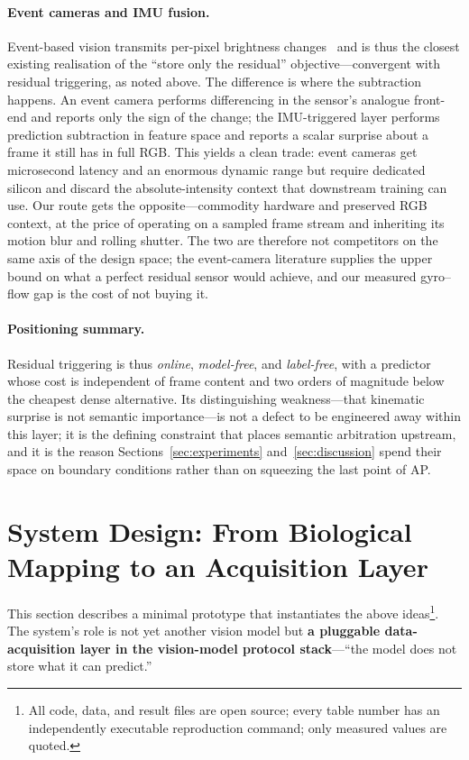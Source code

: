 \documentclass[12pt,a4paper]{article}
\begin{document}
\paragraph{Event cameras and IMU fusion.}
Event-based vision transmits per-pixel brightness changes~\cite{gallego2020} and is thus the closest existing realisation of the ``store only the residual'' objective---convergent with residual triggering, as noted above. The difference is where the subtraction happens. An event camera performs differencing in the sensor's analogue front-end and reports only the sign of the change; the IMU-triggered layer performs prediction subtraction in feature space and reports a scalar surprise about a frame it still has in full RGB. This yields a clean trade: event cameras get microsecond latency and an enormous dynamic range but require dedicated silicon and discard the absolute-intensity context that downstream training can use. Our route gets the opposite---commodity hardware and preserved RGB context, at the price of operating on a sampled frame stream and inheriting its motion blur and rolling shutter. The two are therefore not competitors on the same axis of the design space; the event-camera literature supplies the upper bound on what a perfect residual sensor would achieve, and our measured gyro--flow gap is the cost of not buying it.

\paragraph{Positioning summary.} Residual triggering is thus \emph{online}, \emph{model-free}, and \emph{label-free}, with a predictor whose cost is independent of frame content and two orders of magnitude below the cheapest dense alternative. Its distinguishing weakness---that kinematic surprise is not semantic importance---is not a defect to be engineered away within this layer; it is the defining constraint that places semantic arbitration upstream, and it is the reason Sections~\ref{sec:experiments} and~\ref{sec:discussion} spend their space on boundary conditions rather than on squeezing the last point of AP.

\section{System Design: From Biological Mapping to an Acquisition Layer}
\label{sec:design}

This section describes a minimal prototype that instantiates the above ideas\footnote{All code, data, and result files are open source; every table number has an independently executable reproduction command; only measured values are quoted.}. The system's role is not yet another vision model but \textbf{a pluggable data-acquisition layer in the vision-model protocol stack}---``the model does not store what it can predict.''
\end{document}
